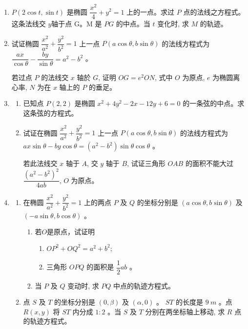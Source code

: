 \documentclass[10pt]{article}
\begin{document}
\begin{enumerate}
  \item $P(2 \cos t, \sin t)$ 是椭圆 $\dfrac{x^{2}}{4}+y^{2}=1$ 上的一点。求过 $P$ 点的法线之方程式。这条法线交 $y$轴于点 G。M 是 $P G$ 的中点。当 $t$ 变化时, 求 $M$ 的轨迹。

  \item 试证椭圆 $\dfrac{x^{2}}{a^{2}}+\dfrac{y^{2}}{b^{2}}=1$ 上一点 $P(a \cos \theta, b \sin \theta)$ 的法线方程式为 $\dfrac{a x}{\cos \theta}-\dfrac{b y}{\sin \theta}=a^{2}-b^{2}$ 。

  若过点 $P$ 的法线交 $x$ 轴於 $G$, 证明 $OG=e^{2} ON$, 式中 $O$ 为原点, $e$ 为椭圆离心率, $N$ 为在 $x$ 轴上的 $P$ 的垂足。

  \item \begin{enumerate}
    \item 已知点 $P(2,2)$ 是椭圆 $x^{2}+4 y^{2}-2 x-12 y+6=0$ 的一条弦的中点。求这条弦的方程式。

    \item 试证在椭圆 $\dfrac{x^{2}}{a^{2}}+\dfrac{y^{2}}{b^{2}}=1$ 上一点 $P(a \cos \theta, b \sin \theta)$ 的法线方程式为 $a x \sin \theta-b y \cos \theta=\left(a^{2}-b^{2}\right) \sin \theta \cos \theta$ 。
  
    若此法线交 $x$ 轴于 $A$, 交 $y$ 轴于 $B$, 试证三角形 $OAB$ 的面积不能大过 $\dfrac{\left(a^{2}-b^{2}\right)^{2}}{4 a b}$, $O$ 为原点。
  \end{enumerate}

  \item \begin{enumerate}
    \item 在椭圆 $\dfrac{x^{2}}{a^{2}}+\dfrac{y^{2}}{b^{2}}=1$ 上的两点 $P$ 及 $Q$ 的坐标分别是 $(a \cos \theta, b \sin \theta)$ 及 $(-a \sin \theta, b \cos \theta)$ 。
    
    \begin{enumerate}
      \item 若$O$是原点，试证明
      \begin{enumerate}
        \item $OP^{2}+OQ^{2}=a^{2}+b^{2}$;
        \item 三角形 $OPQ$ 的面积是 $\dfrac{1}{2} a b$ 。
      \end{enumerate}
    
    \item 当 $P$ 及 $Q$ 变动时, 求 $PQ$ 中点的轨迹方程式。
    \end{enumerate}
  
  \item 点 $S$ 及 $T$ 的坐标分别是 $(0, \beta)$ 及 $(\alpha, 0)$ 。 $ST$ 的长度是 $9 ~m$ 。点 $R(x, y)$ 将 $ST$ 内分成 $1: 2$ 。当 $S$ 及 $T$ 分别在两坐标轴上移动, 求 $R$ 点的轨迹方程式。
  \end{enumerate}


\end{enumerate}
\end{document}
